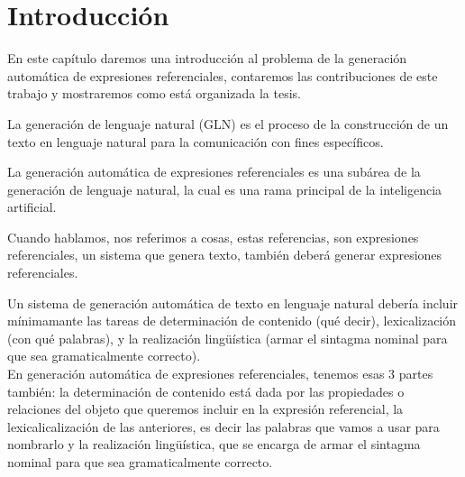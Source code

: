 \chapter{Introducci\'on}


En este cap\'itulo daremos una introducci\'on al problema de la generaci\'on autom\'atica de expresiones referenciales, contaremos las contribuciones de este trabajo y mostraremos como est\'a organizada la tesis.


La generaci\'on de lenguaje natural (GLN) es el proceso de la construcci\'on de un texto en lenguaje natural para la comunicaci\'on con fines espec\'ificos. 

La generaci\'on autom\'atica de expresiones referenciales es una sub\'area de la generaci\'on de lenguaje natural, la cual es una rama principal de la inteligencia artificial.

Cuando hablamos, nos referimos a cosas, estas referencias, son expresiones referenciales, un sistema que genera texto, tambi\'en deber\'a generar expresiones referenciales.


Un sistema de generaci\'on autom\'atica de texto en lenguaje natural deber\'ia incluir m\'inimamante 
las tareas de determinaci\'on de contenido (qu\'e decir), lexicalizaci\'on (con qu\'e palabras), y la realizaci\'on ling\"{u}\'istica (armar el  sintagma nominal para que sea gramaticalmente correcto). \\
En generaci\'on autom\'atica de expresiones referenciales, tenemos esas 3 partes tambi\'en: la determinaci\'on de contenido est\'a dada por las propiedades o relaciones del objeto que queremos incluir en la expresi\'on referencial, la lexicalicalizaci\'on de las anteriores, es decir las palabras que vamos a usar para nombrarlo y la realizaci\'on ling\"u\'istica, que se encarga de armar el sintagma nominal para que sea gramaticalmente correcto.\\

 

\setlength{\unitlength}{1cm}


